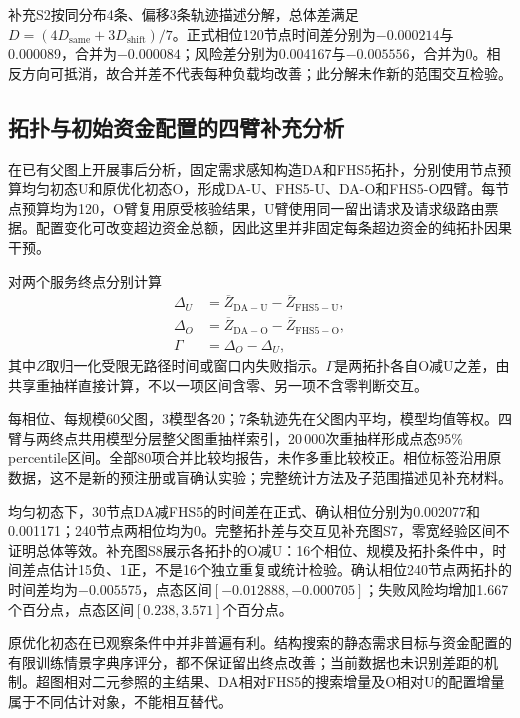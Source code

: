 \documentclass[UTF8,a4paper,twocolumn,fontset=none,zihao=5]{ctexart}
\begin{document}
补充S2按同分布4条、偏移3条轨迹描述分解，总体差满足$D=(4D_{\mathrm{same}}+3D_{\mathrm{shift}})/7$。正式相位120节点时间差分别为$-0.000214$与0.000089，合并为$-0.000084$；风险差分别为0.004167与$-0.005556$，合并为0。相反方向可抵消，故合并差不代表每种负载均改善；此分解未作新的范围交互检验。


\subsection{拓扑与初始资金配置的四臂补充分析}

在已有父图上开展事后分析，固定需求感知构造DA和FHS5拓扑，分别使用节点预算均匀初态U和原优化初态O，形成DA-U、FHS5-U、DA-O和FHS5-O四臂。每节点预算均为120，O臂复用原受核验结果，U臂使用同一留出请求及请求级路由票据。配置变化可改变超边资金总额，因此这里并非固定每条超边资金的纯拓扑因果干预。

对两个服务终点分别计算
\begin{equation}
\begin{aligned}
\Delta_U&=\overline Z_{\mathrm{DA-U}}-\overline Z_{\mathrm{FHS5-U}},\\
\Delta_O&=\overline Z_{\mathrm{DA-O}}-\overline Z_{\mathrm{FHS5-O}},\\
\Gamma&=\Delta_O-\Delta_U,
\end{aligned}\label{eq:s5-interaction}
\end{equation}
其中$Z$取归一化受限无路径时间或窗口内失败指示。$\Gamma$是两拓扑各自O减U之差，由共享重抽样直接计算，不以一项区间含零、另一项不含零判断交互。

每相位、每规模60父图，3模型各20；7条轨迹先在父图内平均，模型均值等权。四臂与两终点共用模型分层整父图重抽样索引，20\,000次重抽样形成点态95\% percentile区间。全部80项合并比较均报告，未作多重比较校正。相位标签沿用原数据，这不是新的预注册或盲确认实验；完整统计方法及子范围描述见补充材料。

均匀初态下，30节点DA减FHS5的时间差在正式、确认相位分别为0.002077和0.001171；240节点两相位均为0。完整拓扑差与交互见补充图S7，零宽经验区间不证明总体等效。补充图S8展示各拓扑的O减U：16个相位、规模及拓扑条件中，时间差点估计15负、1正，不是16个独立重复或统计检验。确认相位240节点两拓扑的时间差均为$-0.005575$，点态区间$[-0.012888,-0.000705]$；失败风险均增加1.667个百分点，点态区间$[0.238,3.571]$个百分点。



原优化初态在已观察条件中并非普遍有利。结构搜索的静态需求目标与资金配置的有限训练情景字典序评分，都不保证留出终点改善；当前数据也未识别差距的机制。超图相对二元参照的主结果、DA相对FHS5的搜索增量及O相对U的配置增量属于不同估计对象，不能相互替代。
\end{document}
